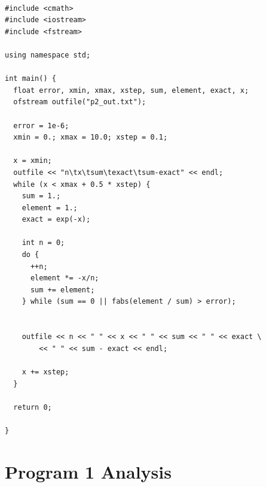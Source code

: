 \documentclass[11pt]{article}
\begin{document}
\begin{verbatim}

#include <cmath>
#include <iostream>
#include <fstream>

using namespace std;

int main() {
  float error, xmin, xmax, xstep, sum, element, exact, x;
  ofstream outfile("p2_out.txt");

  error = 1e-6;
  xmin = 0.; xmax = 10.0; xstep = 0.1;

  x = xmin;
  outfile << "n\tx\tsum\texact\tsum-exact" << endl; 
  while (x < xmax + 0.5 * xstep) {
    sum = 1.;
    element = 1.;
    exact = exp(-x);

    int n = 0;
    do {
      ++n;
      element *= -x/n;
      sum += element;
    } while (sum == 0 || fabs(element / sum) > error);


    outfile << n << " " << x << " " << sum << " " << exact \
        << " " << sum - exact << endl;

    x += xstep;
  }

  return 0;

}

\end{verbatim}

\section{Program 1 Analysis}
\label{sec:orgdb0e617}
\end{document}
